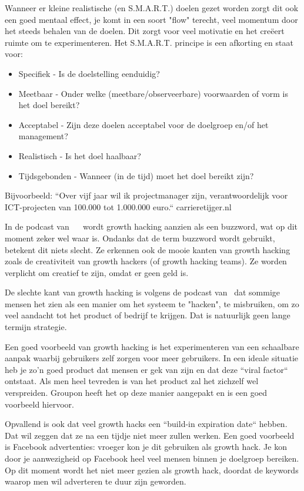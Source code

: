 Wanneer er kleine realistische (en S.M.A.R.T.) doelen gezet worden zorgt dit ook een goed mentaal effect, je komt in een soort "flow" terecht, veel momentum door het steeds behalen van de doelen. Dit zorgt voor veel motivatie en het creëert ruimte om te experimenteren. Het S.M.A.R.T. principe is een afkorting en staat voor:
\begin{itemize}
	\item Specifiek - Is de doelstelling eenduidig?
	\item Meetbaar - Onder welke (meetbare/observeerbare) voorwaarden of vorm is het doel bereikt?
	\item Acceptabel - Zijn deze doelen acceptabel voor de doelgroep en/of het management?
	\item Realistisch - Is het doel haalbaar?
	\item Tijdsgebonden - Wanneer (in de tijd) moet het doel bereikt zijn?
\end{itemize}

Bijvoorbeeld: ``Over vijf jaar wil ik projectmanager zijn, verantwoordelijk voor ICT-projecten van 100.000 tot 1.000.000 euro.`` \textcopyright carrieretijger.nl

In de podcast van ~\textcite{fizzle.co2015}~ wordt growth hacking aanzien als een buzzword, wat op dit moment zeker wel waar is. Ondanks dat de term buzzword wordt gebruikt, betekent dit niets slecht. Ze erkennen ook de mooie kanten van growth hacking zoals de creativiteit van growth hackers (of growth hacking teams). Ze worden verplicht om creatief te zijn, omdat er geen geld is. 

De slechte kant van growth hacking is volgens de podcast van~\autocite{fizzle.co2015} dat sommige mensen het zien als een manier om het systeem te "hacken", te misbruiken, om zo veel aandacht tot het product of bedrijf te krijgen. Dat is natuurlijk geen lange termijn strategie.

Een goed voorbeeld van growth hacking is het experimenteren van een schaalbare aanpak waarbij gebruikers zelf zorgen voor meer gebruikers. In een ideale situatie heb je zo'n goed product dat mensen er gek van zijn en dat deze ``viral factor`` ontstaat. Als men heel tevreden is van het product zal het zichzelf wel verspreiden. Groupon heeft het op deze manier aangepakt en is een goed voorbeeld hiervoor.

Opvallend is ook dat veel growth hacks een ``build-in expiration date`` hebben. Dat wil zeggen dat ze na een tijdje niet meer zullen werken. Een goed voorbeeld is Facebook advertenties: vroeger kon je dit gebruiken als growth hack. Je kon door je aanwezigheid op Facebook heel veel mensen binnen je doelgroep bereiken. Op dit moment wordt het niet meer gezien als growth hack, doordat de keywords waarop men wil adverteren te duur zijn geworden.

